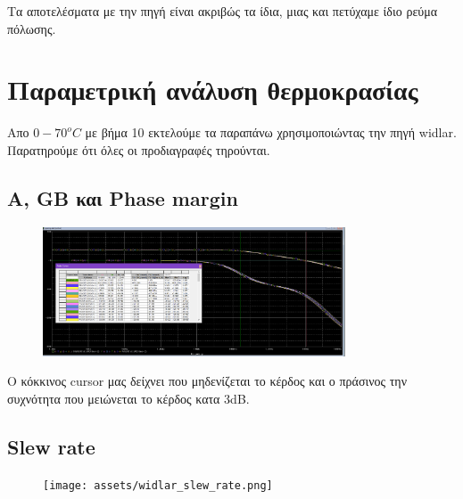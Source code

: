 \documentclass[12pt, a4paper]{article}
\begin{document}
Τα αποτελέσματα με την πηγή είναι ακριβώς τα ίδια, μιας και πετύχαμε ίδιο ρεύμα πόλωσης.

\section{Παραμετρική ανάλυση θερμοκρασίας}

Απο $0-70^oC$ με βήμα 10 εκτελούμε τα παραπάνω χρησιμοποιώντας την πηγή widlar. Παρατηρούμε ότι όλες οι προδιαγραφές τηρούνται.

\subsection{A, GB και Phase margin}

\begin{figure}[h!]
	\centering
	\includegraphics[width = 0.8\textwidth, height = .3\textheight, keepaspectratio]{assets/widlar_all.png}
\end{figure}

Ο κόκκινος cursor μας δείχνει που μηδενίζεται το κέρδος και ο πράσινος την συχνότητα που μειώνεται το κέρδος κατα 3dB.

\pagebreak
\subsection{Slew rate}

\begin{figure}[h!]
	\centering
	\texttt{[image: assets/widlar\_slew\_rate.png]}
\end{figure}
\end{document}
